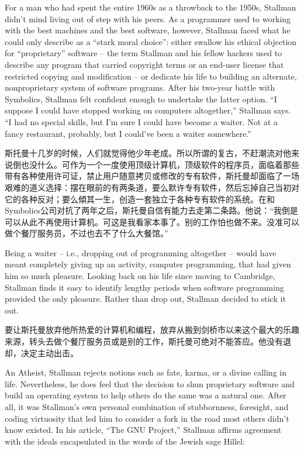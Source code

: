 \ifdefined\eng
For a man who had spent the entire 1960s as a throwback to the 1950s, Stallman didn't mind living out of step with his peers. As a programmer used to working with the best machines and the best software, however, Stallman faced what he could only describe as a ``stark moral choice'': either swallow his ethical objection for ``proprietary'' software -- the term Stallman and his fellow hackers used to describe any program that carried copyright terms or an end-user license that restricted copying and modification -- or dedicate his life to building an alternate, nonproprietary system of software programs. After his two-year battle with Symbolics, Stallman felt confident enough to undertake the latter option. ``I suppose I could have stopped working on computers altogether,'' Stallman says. ``I had no special skills, but I'm sure I could have become a waiter. Not at a fancy restaurant, probably, but I could've been a waiter somewhere.''
\fi

\ifdefined\chs
斯托曼十几岁的时候，人们就觉得他少年老成。所以所谓的复古，不赶潮流对他来说倒也没什么。可作为一个一度使用顶级计算机，顶级软件的程序员，面临着那些带有各种使用许可证，禁止用户随意拷贝或修改的专有软件，斯托曼却面临了一场艰难的道义选择：摆在眼前的有两条道，要么默许专有软件，然后忘掉自己当初对它的各种反对；要么傾其一生，创造一套独立于各种专有软件的系统。在和Symbolics公司对抗了两年之后，斯托曼自信有能力去走第二条路。他说：``我倒是可以从此不再使用计算机。可这是我看家本事了。别的工作怕也做不来。没准可以做个餐厅服务员，不过也去不了什么大餐馆。''
\fi

\ifdefined\eng
Being a waiter -- i.e., dropping out of programming altogether -- would have meant completely giving up an activity, computer programming, that had given him so much pleasure. Looking back on his life since moving to Cambridge, Stallman finds it easy to identify lengthy periods when software programming provided the only pleasure. Rather than drop out, Stallman decided to stick it out.
\fi

\ifdefined\chs
要让斯托曼放弃他所热爱的计算机和编程，放弃从搬到剑桥市以来这个最大的乐趣来源，转头去做个餐厅服务员或是别的工作，斯托曼可绝对不能答应。他没有退却，决定主动出击。
\fi

\ifdefined\eng
An Atheist, Stallman rejects notions such as fate, karma, or a divine calling in life. Nevertheless, he does feel that the decision to shun proprietary software and build an operating system to help others do the same was a natural one. After all, it was Stallman's own personal combination of stubbornness, foresight, and coding virtuosity that led him to consider a fork in the road most others didn't know existed. In his article, ``The GNU Project,'' Stallman affirms agreement with the ideals encapsulated in the words of the Jewish sage Hillel:
\fi

